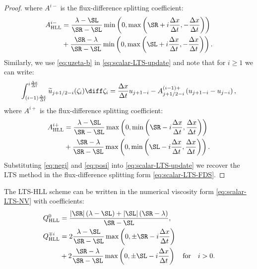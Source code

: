 \begin{proof}
where $ A^{i-} $ is the flux-difference splitting coefficient:
\begin{align}\label{eq:scalar-HLL-Aminus}
A_\text{HLL}^{i-} & = \frac{\lambda - \SL}{\SR - \SL} \min \left( 0, \max \left( \SR + i \frac{\Delta x}{\Delta t}, -\frac{\Delta x}{\Delta t} \right) \right) \notag \\
& + \frac{\SR - \lambda}{\SR - \SL} \min \left( 0, \max \left( \SL + i \frac{\Delta x}{\Delta t}, -\frac{\Delta x}{\Delta t} \right) \right). 
\end{align}
Similarly, we use \eqref{eq:uzeta-b} in \eqref{eq:scalar-LTS-update} and note that for $i\geq 1$ we can write:
\begin{equation}\label{eq:posi}
\int_{(i-1)\frac{\Delta x}{\Delta t}}^{i\frac{\Delta x}{\Delta t}} \widetilde{u}_{j+1/2-i} (\zeta_i)\diff \zeta_i=\frac{\Delta x}{\Delta t}u_{j+1-i}- A_{j+1/2-i}^{(i-1)+}\left(u_{j+1-i}-u_{j-i}\right),
\end{equation}
where $ A^{i+} $ is the flux-difference splitting coefficient:
\begin{align}\label{eq:scalar-HLL-Aplus}
A_\text{HLL}^{i+} & = \frac{\lambda - \SL}{\SR - \SL} 
\max \left( 0, \min \left( \SR - i \frac{\Delta x}{\Delta t}, \frac{\Delta x}{\Delta t} \right) \right) \notag \\
& + \frac{\SR - \lambda}{\SR - \SL} 
\max \left( 0, \min \left( \SL - i \frac{\Delta x}{\Delta t}, \frac{\Delta x}{\Delta t} \right) \right). 
\end{align}
Substituting \eqref{eq:negi} and \eqref{eq:posi} into \eqref{eq:scalar-LTS-update} we recover the LTS method in the flux-difference splitting form \eqref{eq:scalar-LTS-FDS}.
\end{proof}

\begin{proposition}
The LTS-HLL scheme can be written in the numerical viscosity form \eqref{eq:scalar-LTS-NV} with coefficients:
\begin{subequations} \label{eq:scalar-LTS-HLL-Q}
\begin{align}
Q_\text{HLL}^0 & = \frac{\left| \SR \right| \left( \lambda - \SL \right) + \left| \SL \right| \left( \SR - \lambda \right) }{\SR - \SL}, \\
Q_\text{HLL}^{\mp i} & = 2 \frac{\lambda - \SL}{\SR - \SL} \max \left( 0, \pm \SR - i \frac{\Delta x}{\Delta t} \right) \notag \\
& + 2 \frac{\SR - \lambda}{\SR - \SL} \max \left( 0, \pm \SL - i \frac{\Delta x}{\Delta t} \right) \quad \text{for} \quad i>0. 
\end{align} 
\end{subequations}
\end{proposition}

